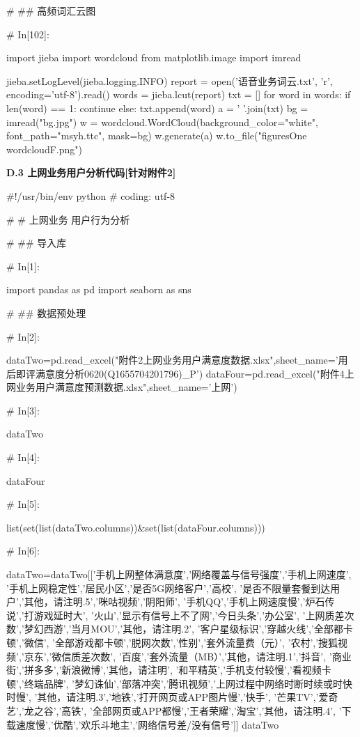 \documentclass{MathorCupmodeling}
\begin{document}
\begin{python}
# ## 高频词汇云图

# In[102]:


import jieba
import wordcloud
from matplotlib.image import imread

jieba.setLogLevel(jieba.logging.INFO)
report = open('语音业务词云.txt', 'r', encoding='utf-8').read()
words = jieba.lcut(report)
txt = []
for word in words:
    if len(word) == 1:
        continue
    else:
        txt.append(word)
a = ' '.join(txt)
bg = imread("bg.jpg")
w = wordcloud.WordCloud(background_color="white", font_path="msyh.ttc", mask=bg)
w.generate(a)
w.to_file("figuresOne\\wordcloudF.png")

\end{python}
\newpage
\textbf{D.3 上网业务用户分析代码[针对附件2]}
\begin{python}
#!/usr/bin/env python
# coding: utf-8

# # 上网业务 用户行为分析

# ## 导入库

# In[1]:


import pandas as pd
import seaborn as sns


# ## 数据预处理

# In[2]:


dataTwo=pd.read_excel("附件2上网业务用户满意度数据.xlsx",sheet_name='用后即评满意度分析0620(Q1655704201796)_P')
dataFour=pd.read_excel("附件4上网业务用户满意度预测数据.xlsx",sheet_name='上网')


# In[3]:


dataTwo


# In[4]:


dataFour


# In[5]:


list(set(list(dataTwo.columns))&set(list(dataFour.columns)))


# In[6]:


dataTwo=dataTwo[['手机上网整体满意度','网络覆盖与信号强度','手机上网速度',
				 '手机上网稳定性','居民小区','是否5G网络客户','高校',
                 '是否不限量套餐到达用户','其他，请注明.5','咪咕视频','阴阳师',
                 '手机QQ','手机上网速度慢','炉石传说','打游戏延时大',
                 '火山','显示有信号上不了网','今日头条','办公室',
                 '上网质差次数','梦幻西游','当月MOU','其他，请注明.2',
                 '客户星级标识','穿越火线','全部都卡顿','微信',
                 '全部游戏都卡顿','脱网次数','性别','套外流量费（元）',
                 '农村','搜狐视频','京东','微信质差次数',
                 '百度','套外流量（MB）','其他，请注明.1','抖音',
                 '商业街','拼多多','新浪微博','其他，请注明',
                 '和平精英','手机支付较慢','看视频卡顿','终端品牌',
                 '梦幻诛仙','部落冲突','腾讯视频','上网过程中网络时断时续或时快时慢',
                 '其他，请注明.3','地铁','打开网页或APP图片慢','快手',
                 '芒果TV','爱奇艺','龙之谷','高铁',
                 '全部网页或APP都慢','王者荣耀','淘宝','其他，请注明.4',
                 '下载速度慢','优酷','欢乐斗地主','网络信号差/没有信号']]
dataTwo



\end{python}
\end{document}
